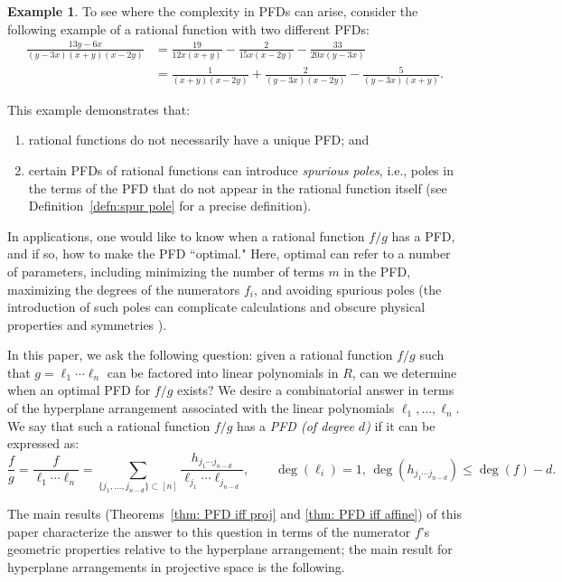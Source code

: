 \documentclass [a4paper,reqno, 11pt]{amsart}
\theoremstyle{plain}
\theoremstyle{plain}
\theoremstyle{plain}
\theoremstyle{plain}
\theoremstyle{definition}
\theoremstyle{definition}
\newtheorem{example}[theorem]{Example}
\theoremstyle{definition}
\theoremstyle{definition}
\theoremstyle{definition}
\theoremstyle{definition}
\begin{document}
\begin{example}\label{eg:intro}
To see where the complexity in PFDs can arise, consider the following example of a rational function with two different PFDs:
\begin{equation*}
\begin{split}
    \frac{13y-6x}{(y-3x)(x+y)(x-2y)}&=\frac{19}{12x(x+y)}-\frac{2}{15x(x-2y)}-\frac{33}{20x(y-3x)}\\
    &=\frac{1}{(x+y)(x-2y)}+\frac{2}{(y-3x)(x-2y)}-\frac{5}{(y-3x)(x+y)}.
\end{split}
\end{equation*}
\end{example}
\noindent This example demonstrates that:
\begin{enumerate}
    \item rational functions do not necessarily have a unique PFD; and
    \item certain PFDs of rational functions can introduce \emph{spurious poles}, i.e., poles in the terms of the PFD that do not appear in the rational function itself (see Definition~\ref{defn:spur pole} for a precise definition).
\end{enumerate}

In applications, one would like to know when a rational function $f/g$ has a PFD, and if so, how to make the PFD ``optimal." Here, optimal can refer to a number of parameters, including minimizing the number of terms $m$ in the PFD, maximizing the degrees of the numerators $f_i$, and avoiding spurious poles (the introduction of such poles can complicate calculations and obscure physical properties and symmetries \cite{Hod}).


In this paper, we ask the following question: given a rational function $f/g$ such that $g=\ell_1\cdots\ell_n$ can be factored into linear polynomials in $R$, can we determine when an optimal PFD for $f/g$ exists? We desire a combinatorial answer in terms of the hyperplane arrangement associated with the linear polynomials $\ell_1,\ldots,\ell_n$. We say that such a rational function $f/g$ has a \emph{PFD (of degree $d$)} if it can be expressed as:
\begin{equation}\label{eqn:d PFD}
    \frac{f}{g}=\frac{f}{\ell_1\cdots\ell_n}=\sum_{\{j_1,\ldots,j_{n-d}\}\subset[n]} \frac{h_{j_1\cdots j_{n-d}}}{\ell_{j_1}\cdots\ell_{j_{n-d}}},\qquad \deg(\ell_i)=1,\,\deg(h_{j_1\cdots j_{n-d}})\leq \deg(f)-d.
\end{equation}


The main results (Theorems~\ref{thm: PFD iff proj} and \ref{thm: PFD iff affine}) of this paper characterize the answer to this question in terms of the numerator $f$'s geometric properties relative to the hyperplane arrangement; the main result for hyperplane arrangements in projective space is the following.
\end{document}
